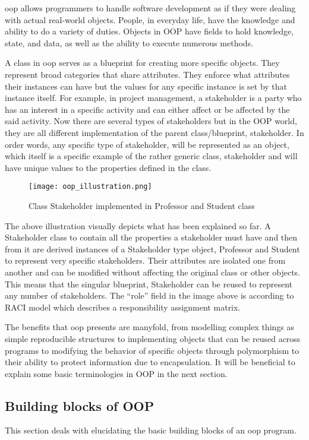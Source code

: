 \ac{oop} allows programmers to handle software development as if they were dealing with actual real-world objects. People, in everyday life, have the knowledge and ability to do a variety of duties. Objects in OOP have fields to hold knowledge, state, and data, as well as the ability to execute numerous methods.

A class in \ac{oop} serves as a blueprint for creating more specific objects. They represent broad categories that share attributes. They enforce what attributes their instances can have but the values for any specific instance is set by that instance itself. For example, in project management, a stakeholder is a party who has an interest in a specific activity and can either affect or be affected by the said activity. Now there are several types of stakeholders but in the OOP world, they are all different implementation of the parent class/blueprint, stakeholder. In order words, any specific type of stakeholder, will be represented as an object, which itself is a specific example of the rather generic class, stakeholder and will have unique values to the properties defined in the class.
\begin{figure}[h]
  \centering
  \texttt{[image: oop\_illustration.png]}
  \caption{Class Stakeholder implemented in Professor and Student class}
  \label{class blueprint}
\end{figure}

The above illustration visually depicts what has been explained so far. A Stakeholder class to contain all the properties a stakeholder must have and then from it are derived instances of a Stakeholder type object, Professor and Student to represent very specific stakeholders. Their attributes are isolated one from another and can be modified without affecting the original class or other objects. This means that the singular blueprint, Stakeholder can be reused to represent any number of stakeholders. The “role” field in the image above is according to RACI model which describes a responsibility assignment matrix.

The benefits that \acs{oop} presents are manyfold, from modelling complex things as simple reproducible structures to implementing objects that can be reused across programs to modifying the behavior of specific objects through polymorphism to their ability to protect information due to encapsulation.
It will be beneficial to explain some basic terminologies in OOP in the next section.

\subsection{Building blocks of OOP}
This section deals with elucidating the basic building blocks of an \acs{oop} program.

